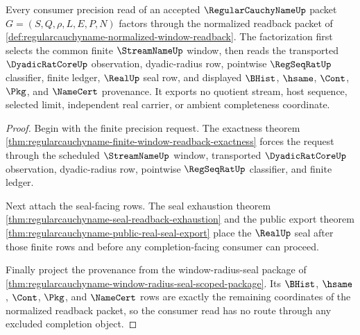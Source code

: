 \begin{theorem}
\label{thm:regularcauchyname-window-normalization-coverage}
Every consumer precision read of an accepted $\RegularCauchyNameUp$ packet $G=(S,Q,\rho,L,E,P,N)$ factors through the normalized readback packet of \autoref{def:regularcauchyname-normalized-window-readback}. The factorization first selects the common finite $\StreamNameUp$ window, then reads the transported $\DyadicRatCoreUp$ observation, dyadic-radius row, pointwise $\RegSeqRatUp$ classifier, finite ledger, $\RealUp$ seal row, and displayed $\BHist$, $\hsame$, $\Cont$, $\Pkg$, and $\NameCert$ provenance. It exports no quotient stream, host sequence, selected limit, independent real carrier, or ambient completeness coordinate.
\end{theorem}
\begin{proof}
Begin with the finite precision request. The exactness theorem \autoref{thm:regularcauchyname-finite-window-readback-exactness} forces the request through the scheduled $\StreamNameUp$ window, transported $\DyadicRatCoreUp$ observation, dyadic-radius row, pointwise $\RegSeqRatUp$ classifier, and finite ledger.

Next attach the seal-facing rows. The seal exhaustion theorem \autoref{thm:regularcauchyname-seal-readback-exhaustion} and the public export theorem \autoref{thm:regularcauchyname-public-real-seal-export} place the $\RealUp$ seal after those finite rows and before any completion-facing consumer can proceed.

Finally project the provenance from the window-radius-seal package of \autoref{thm:regularcauchyname-window-radius-seal-scoped-package}. Its $\BHist$, $\hsame$, $\Cont$, $\Pkg$, and $\NameCert$ rows are exactly the remaining coordinates of the normalized readback packet, so the consumer read has no route through any excluded completion object.
\end{proof}

